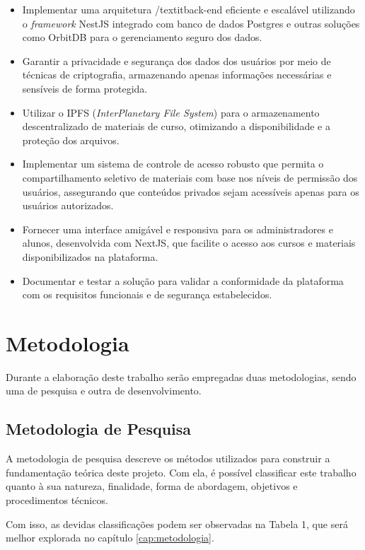 \begin{itemize}
    \item Implementar uma arquitetura /textit{back-end} eficiente e escalável utilizando o \textit{framework} NestJS integrado com banco de dados Postgres e outras soluções como OrbitDB para o gerenciamento seguro dos dados.
    \item Garantir a privacidade e segurança dos dados dos usuários por meio de técnicas de criptografia, armazenando apenas informações necessárias e sensíveis de forma protegida.
    \item Utilizar o IPFS (\textit{InterPlanetary File System}) para o armazenamento descentralizado de materiais de curso, otimizando a disponibilidade e a proteção dos arquivos.
    \item Implementar um sistema de controle de acesso robusto que permita o compartilhamento seletivo de materiais com base nos níveis de permissão dos usuários, assegurando que conteúdos privados sejam acessíveis apenas para os usuários autorizados.
    \item Fornecer uma interface amigável e responsiva para os administradores e alunos, desenvolvida com NextJS, que facilite o acesso aos cursos e materiais disponibilizados na plataforma.
    \item Documentar e testar a solução para validar a conformidade da plataforma com os requisitos funcionais e de segurança estabelecidos.
\end{itemize}

\section{Metodologia}

Durante a elaboração deste trabalho serão empregadas duas metodologias, sendo uma de pesquisa e outra de desenvolvimento.

\subsection{Metodologia de Pesquisa}

A metodologia de pesquisa descreve os métodos utilizados para construir a fundamentação teórica deste projeto. Com ela, é possível classificar este trabalho quanto à sua natureza, finalidade, forma de abordagem, objetivos e procedimentos técnicos.

Com isso, as devidas classificações podem ser observadas na Tabela 1, que será melhor explorada no capítulo \ref{cap:metodologia}.


